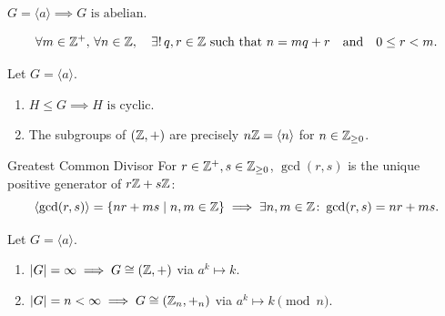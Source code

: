 \documentclass[12pt,a4paper]{article}
\begin{document}
    \begin{thm}
        $G = \langle a \rangle \implies G \text{ is abelian}$.
    \end{thm}
    \bigskip
    
    \begin{thm}
        \[
            \forall m \in \mathbb{Z}^+, \, \forall n \in \mathbb{Z}, \quad \exists! \, q, r \in \mathbb{Z} \text{ such that } n = mq + r \quad\text{and}\quad 0 \le r < m.
        \]
    \end{thm}
    \bigskip
    
    \begin{thm}
        Let $G = \langle a \rangle$.
        \begin{enumerate}
            \item $H \le G \implies H \text{ is cyclic}$.
            \item The subgroups of $(\mathbb{Z}, +)$ are precisely $n\mathbb{Z} = \langle n \rangle$ for $n \in \mathbb{Z}_{\ge 0}$.
        \end{enumerate}
    \end{thm}
    \bigskip
    
    \begin{defi}{Greatest Common Divisor}
        For $r \in \mathbb{Z}^+, s \in \mathbb{Z}_{\ge 0}$, $\gcd(r, s)$ is the unique positive generator of $r\mathbb{Z} + s\mathbb{Z}$:
        \[
            \langle \gcd(r, s) \rangle = \left\{ nr + ms \mid n, m \in \mathbb{Z} \right\} \implies \exists n, m \in \mathbb{Z} \colon \gcd(r, s) = nr + ms.
        \]
    \end{defi}
    \bigskip
    
    \begin{thm}
        Let $G = \langle a \rangle$.
        \begin{enumerate}
            \item $\left\lvert G \right\rvert = \infty \implies G \cong (\mathbb{Z}, +)$ via $a^k \mapsto k$.
            \item $\left\lvert G \right\rvert = n < \infty \implies G \cong (\mathbb{Z}_n, +_n)$ via $a^k \mapsto k \pmod n$.
        \end{enumerate}
    \end{thm}
    \bigskip
    
\end{document}
